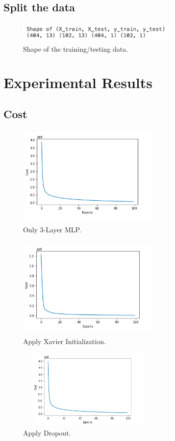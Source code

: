 \documentclass[conference]{IEEEtran}
\begin{document}
\subsection{Split the data}
\begin{figure}[htbp]
\centerline{\includegraphics[width=8cm, height=1cm]{4.png}}
\caption{Shape of the training/testing data.}
\label{4}
\end{figure}




\section{Experimental Results}

\subsection{Cost}
\begin{figure}[htbp]
\centerline{\includegraphics[width=7cm, height=5cm]{cost.png}}
\caption{Only 3-Layer MLP.}
\label{cost}
\end{figure}
\begin{figure}[htbp]
\centerline{\includegraphics[width=7cm, height=5cm]{cost_xav.png}}
\caption{Apply Xavier Initialization.}
\label{cost_xav}
\end{figure}
\begin{figure}[htbp]
\centerline{\includegraphics[width=7cm, height=3.9cm]{cost_dropout.png}}
\caption{Apply Dropout.}
\label{cost_dropout}
\end{figure}
\newpage
\end{document}
